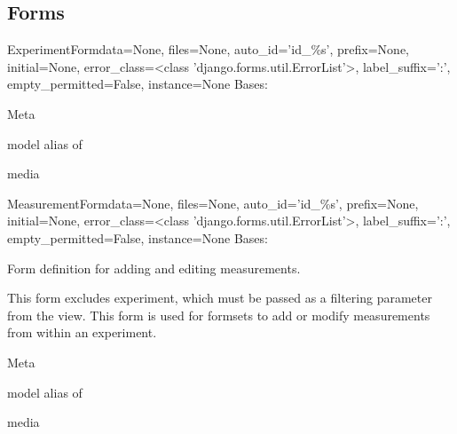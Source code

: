 \documentclass[letterpaper,10pt,english]{sphinxmanual}
\begin{document}
\subsection{Forms}
\hypertarget{module-data.forms}{}
\modulesynopsis{}

\hypertarget{data.forms.ExperimentForm}{}\begin{classdesc}{ExperimentForm}{data=None, files=None, auto\_id='id\_\%s', prefix=None, initial=None, error\_class=\textless{}class 'django.forms.util.ErrorList'\textgreater{}, label\_suffix=':', empty\_permitted=False, instance=None}
Bases: 

\hypertarget{data.forms.ExperimentForm.Meta}{}\begin{classdesc}{Meta}{}~

\hypertarget{data.forms.ExperimentForm.Meta.model}{}\begin{memberdesc}{model}
alias of 
\end{memberdesc}
\end{classdesc}

\hypertarget{data.forms.ExperimentForm.media}{}\begin{memberdesc}[ExperimentForm]{media}\end{memberdesc}
\end{classdesc}

\hypertarget{data.forms.MeasurementForm}{}\begin{classdesc}{MeasurementForm}{data=None, files=None, auto\_id='id\_\%s', prefix=None, initial=None, error\_class=\textless{}class 'django.forms.util.ErrorList'\textgreater{}, label\_suffix=':', empty\_permitted=False, instance=None}
Bases: 

Form definition for adding and editing measurements.

This form excludes experiment, which must be passed as a filtering parameter from the view.  
This form is used for formsets to add or modify measurements from within an experiment.

\hypertarget{data.forms.MeasurementForm.Meta}{}\begin{classdesc}{Meta}{}~

\hypertarget{data.forms.MeasurementForm.Meta.model}{}\begin{memberdesc}{model}
alias of 
\end{memberdesc}
\end{classdesc}

\hypertarget{data.forms.MeasurementForm.media}{}\begin{memberdesc}[MeasurementForm]{media}\end{memberdesc}
\end{classdesc}
\end{document}
